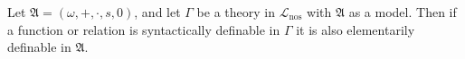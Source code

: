 Let $\mathfrak{A} = (\omega, +, \cdot, s, 0)$, and let $\Gamma$ be a theory in $\mathcal{L}_{\text{nos}}$ with $\mathfrak{A}$ as a model. Then if a function or relation is syntactically definable in $\Gamma$ it is also elementarily definable in $\mathfrak{A}$.
